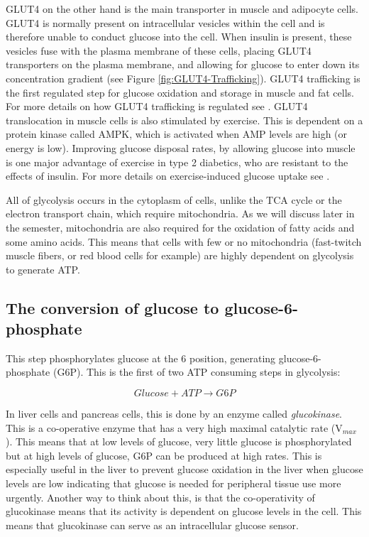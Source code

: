 \documentclass{tufte-handout}
\begin{document}
GLUT4 on the other hand is the main transporter in muscle and adipocyte cells.  GLUT4 is normally present on intracellular vesicles within the cell and is therefore unable to conduct glucose into the cell.  When insulin is present, these vesicles fuse with the plasma membrane of these cells, placing GLUT4 transporters on the plasma membrane, and allowing for glucose to enter down its concentration gradient (see Figure \ref{fig:GLUT4-Trafficking}).  GLUT4 trafficking is the first regulated step for glucose oxidation and storage in muscle and fat cells.  For more details on how GLUT4 trafficking is regulated see \citet{Leto2013}.  GLUT4 translocation in muscle cells is also stimulated by exercise.  This is dependent on a protein kinase called AMPK, which is activated when AMP levels are high (or energy is low).  Improving glucose disposal rates, by allowing glucose into muscle is one major advantage of exercise in type 2 diabetics, who are resistant to the effects of insulin.  For more details on exercise-induced glucose uptake see \citet{Richter2013}.


  All of glycolysis occurs in the cytoplasm of cells, unlike the TCA cycle or the electron transport chain, which require mitochondria.  As we will discuss later in the semester, mitochondria are also required for the oxidation of fatty acids and some amino acids.  This means that cells with few or no mitochondria (fast-twitch muscle fibers, or red blood cells for example) are highly dependent on glycolysis to generate ATP.

\subsection{The conversion of glucose to glucose-6-phosphate}

   This step phosphorylates glucose at the 6 position, generating glucose-6-phosphate (G6P).  This is the first of two ATP consuming steps in glycolysis:

\begin{equation}\label{eq:glucokinase}
Glucose + ATP \rightarrow G6P
\end{equation}

In liver cells and pancreas cells, this is done by an enzyme called \emph{glucokinase}.  This is a co-operative enzyme that has a very high maximal catalytic rate (V$_{max}$).  This means that at low levels of glucose, very little glucose is phosphorylated but at high levels of glucose, G6P can be produced at high rates. This is especially useful in the liver to prevent glucose oxidation in the liver when glucose levels are low indicating that glucose is needed for peripheral tissue use more urgently. Another way to think about this, is that the co-operativity of glucokinase means that its activity is dependent on glucose levels in the cell.  This means that glucokinase can serve as an intracellular glucose sensor.
\end{document}
